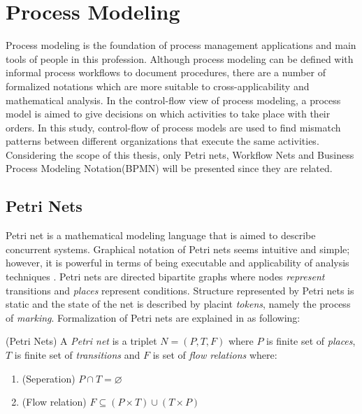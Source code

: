 \section{Process Modeling}
\label{sec:process-modeling}
Process modeling is the foundation of process management applications and main tools of people in this profession. Although process modeling can be defined with informal process workflows to document procedures, there are a number of formalized notations which are more suitable to cross-applicability and mathematical analysis. In the control-flow view of process modeling, a process model is aimed to give decisions on which activities to take place with their orders. In this study, control-flow of process models are used to find mismatch patterns between different organizations that execute the same activities. Considering the scope of this  thesis, only Petri nets, Workflow Nets and Business Process Modeling Notation(BPMN) will be presented since they are related. 

\subsection{Petri Nets}
\label{sec:petri-nets}
Petri net is a mathematical modeling language that is aimed to describe concurrent systems. Graphical notation of Petri nets seems intuitive and simple; however, it is powerful in terms of being executable and applicability of analysis techniques \cite{vanderAalst:2011:MBP:2000715}. Petri nets are directed bipartite graphs where nodes \textit{represent} transitions and \textit{places} represent conditions. Structure represented by Petri nets is static and the state of the net is described by placint \textit{tokens}, namely the process of \textit{marking}. Formalization of Petri nets are explained in \cite{reisig1998lectures} as following:

\theoremstyle{definition}
\begin{definition}{}
(Petri Nets) A \textit{Petri net} is a triplet $N = (P, T, F)$ where $P$ is finite set of \textit{places}, $T$ is finite set of \textit{transitions} and $F$ is set of \textit{flow relations} where:
\begin{enumerate}
  \item (Seperation) $P \cap T = \varnothing$
  \item (Flow relation) $F \subseteq (P \times T) \cup (T \times P)$
\end{enumerate}
\end{definition}


